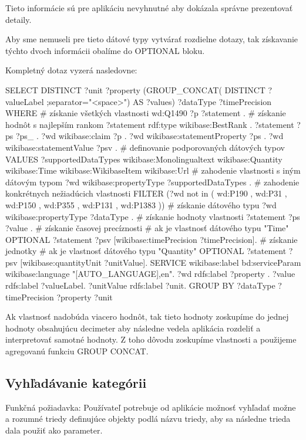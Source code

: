 Tieto informácie sú pre aplikáciu nevyhnutné aby dokázala správne prezentovať detaily.

Aby sme nemuseli pre tieto dátové typy vytvárať rozdielne dotazy, tak získavanie týchto dvoch informácii obalíme do
OPTIONAL bloku.

Kompletný dotaz vyzerá nasledovne:
\begin{code}
      SELECT DISTINCT
      ?unit
      ?property
      (GROUP_CONCAT( DISTINCT ?valueLabel ;separator="<space>") AS ?values)
      ?dataType
      ?timePrecision
      WHERE {
      # získanie všetkých vlastnosti
      wd:Q1490 ?p ?statement .
      # získanie hodnôt s najlepším rankom
      ?statement rdf:type wikibase:BestRank .
      ?statement ?ps ?ps_ .
      ?wd wikibase:claim ?p .
      ?wd wikibase:statementProperty ?ps .
      ?wd wikibase:statementValue ?psv .
      # definovanie podporovaných dátových typov
      VALUES ?supportedDataTypes {
      wikibase:Monolingualtext
      wikibase:Quantity
      wikibase:Time
      wikibase:WikibaseItem
      wikibase:Url  }
      # zahodenie vlastnosti s iným dátovým typom
      ?wd wikibase:propertyType ?supportedDataTypes .
      # zahodenie konkrétnych nežiadúcich vlastnosti
      FILTER (?wd not in ( wd:P190 , wd:P31 , wd:P150 , wd:P355 , wd:P131 , wd:P1383 ))
      # získanie dátového typu
      ?wd wikibase:propertyType ?dataType .
      # získanie hodnoty vlastnosti
      ?statement ?ps ?value .
      # získanie časovej precíznosti
      # ak je vlastnosť dátového typu "Time"
      OPTIONAL {?statement ?psv [wikibase:timePrecision  ?timePrecision].}
      # získanie jednotky
      # ak je vlastnosť dátového typu "Quantity"
      OPTIONAL {?statement ?psv [wikibase:quantityUnit  ?unitValue].}
      SERVICE wikibase:label {
      bd:serviceParam wikibase:language "[AUTO_LANGUAGE],en".
      ?wd rdfs:label ?property .
      ?value rdfs:label ?valueLabel.
      ?unitValue rdfs:label ?unit. }
      } GROUP BY ?dataType ?timePrecision ?property ?unit
\end{code}

Ak vlastnosť nadobúda viacero hodnôt, tak tieto hodnoty zoskupíme do jednej hodnoty obsahujúcu
decimeter aby následne vedela aplikácia rozdeliť a interpretovať samotné hodnoty. Z toho dôvodu zoskupíme vlastnosti a použijeme
agregovanú funkciu GROUP CONCAT.

\subsection{Vyhľadávanie kategórii}
Funkčná požiadavka:  Používateľ potrebuje od aplikácie možnosť vyhľadať možne a rozumné triedy definujúce
objekty podlá názvu triedy, aby sa následne trieda dala použiť ako parameter.

